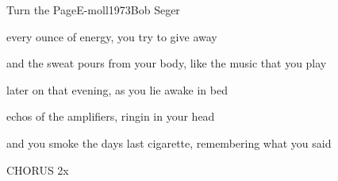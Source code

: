 \documentclass[a4paper,draft]{book}
\begin{document}
\begin{song}{Turn the Page}{E-moll}{1973}{Bob Seger}{}{}
\begin{SBVerse}
	every ounce of energy, you try to give away

	and the sweat pours from your body, like the music that you play
	\end{SBVerse}
	\begin{SBVerse}
	later on that evening, as you lie awake in bed

	echos of the amplifiers, ringin in your head

	and you smoke the days last cigarette, remembering what you said
	\end{SBVerse}
	\begin{SBChorus}
	CHORUS 2x
	\end{SBChorus}
\end{song}

\end{document}
